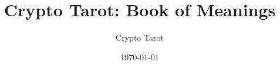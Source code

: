 \documentclass[11pt,oneside]{book}
\begin{document}
\title{Crypto Tarot: Book of Meanings}
\author{Crypto Tarot}
\date{\today}
\maketitle

\tableofcontents
\newpage

\end{document}
